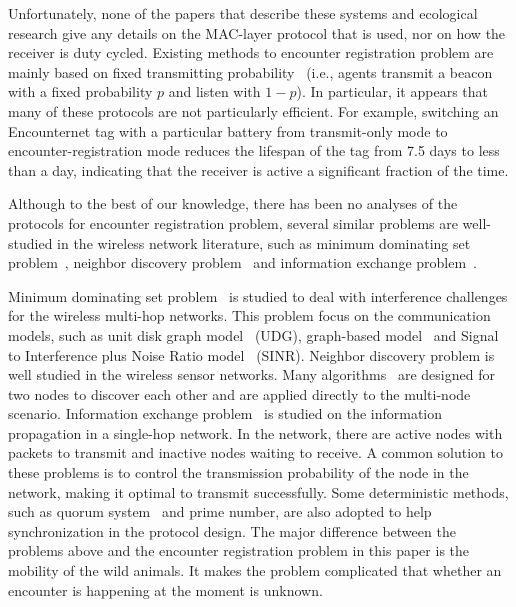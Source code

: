 Unfortunately, none of the papers that describe these systems and 
ecological research give any details on the
MAC-layer protocol that is used, nor on how the receiver is duty cycled. 
Existing methods to encounter registration problem are mainly based on fixed transmitting 
probability~\cite{Menhill2012NovelTelemetry,Rutz2012AutomatedMapping}
(i.e., agents transmit a beacon with a fixed probability $p$ and listen with $1-p$). 
In particular, it appears that many of these 
protocols are not particularly efficient. For example, switching 
an Encounternet tag with a particular battery from
transmit-only mode 
to encounter-registration mode reduces the lifespan
of the tag from 7.5 days to less than a day, indicating that the 
receiver is active a significant fraction of the time.

Although to the best of our knowledge, there has been no analyses of the protocols 
for encounter registration problem,
several similar problems are well-studied in the wireless network literature, 
such as  
minimum dominating set problem~\cite{Scheideler2008An,Yu2013Review},
neighbor discovery problem~\cite{Bakht2012Searchlight, Sun2014Hello,Chen2015On}
and information exchange problem~\cite{Capetanakis1979Tree,Daum2013Maximal,Yu2017Uniform}.

Minimum dominating set problem~\cite{Scheideler2008An,Yu2013Review} is studied to 
deal with interference challenges for the wireless multi-hop networks.
This problem focus on the communication models, such as unit disk graph model~\cite{Lebhar2009Unit} (UDG),
graph-based model~\cite{De2007A} and Signal to Interference plus Noise Ratio model~\cite{Lee2007Signal} (SINR).
Neighbor discovery problem is well studied in the wireless sensor 
networks. Many algorithms~\cite{Bakht2012Searchlight, Sun2014Hello,Chen2015On} 
are designed for two nodes to discover each other and 
are applied directly to the multi-node scenario.
Information exchange problem~\cite{Capetanakis1979Tree,Daum2013Maximal,Yu2017Uniform} is 
studied on the information propagation in a single-hop network. 
In the network, there are active nodes with packets to transmit 
and inactive nodes waiting to receive.
A common solution to these problems is to control the transmission probability of the node in the 
network, making it optimal to transmit successfully.
Some deterministic methods, such as quorum system~\cite{Peleg1995The} and prime number, are also 
adopted to help synchronization in the protocol design.
The major difference between the problems above and the encounter registration problem
in this paper is the mobility of the wild animals. It makes the problem 
complicated that whether an encounter is happening at the moment is unknown.
  

